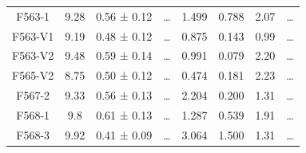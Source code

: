 \documentclass[reprint,%
 amsmath,amssymb,
 aps,
]{revtex4-1}
\begin{document}
\begin{longtable*}{|c|c|c|c|c|c|c|c| }
F563-1               & 9.28                      & 0.56 ± 0.12           & …                      & 1.499                                                        & 0.788                                                         & 2.07                                                           & …                                                             \\
F563-V1              & 9.19                      & 0.48 ± 0.12           & …                      & 0.875                                                        & 0.143                                                         & 0.99                                                           & …                                                             \\
F563-V2              & 9.48                      & 0.59 ± 0.14           & …                      & 0.991                                                        & 0.079                                                       & 2.20                                                           & …                                                             \\
F565-V2              & 8.75                      & 0.50 ± 0.12           & …                      & 0.474                                                        & 0.181                                                        & 2.23                                                           & …                                                             \\
F567-2               & 9.33                      & 0.56 ± 0.13           & …                      & 2.204                                                        & 0.200                                                       & 1.31                                                           & …                                                             \\
F568-1               & 9.8                       & 0.61 ± 0.13           & …                      & 1.287                                                        & 0.539                                                        & 1.91                                                            & …                                                             \\
F568-3               & 9.92                      & 0.41 ± 0.09           & …                      & 3.064                                                        & 1.500                                                          & 1.31                                                           & …                                                             \\

\end{longtable*}
\end{document}
